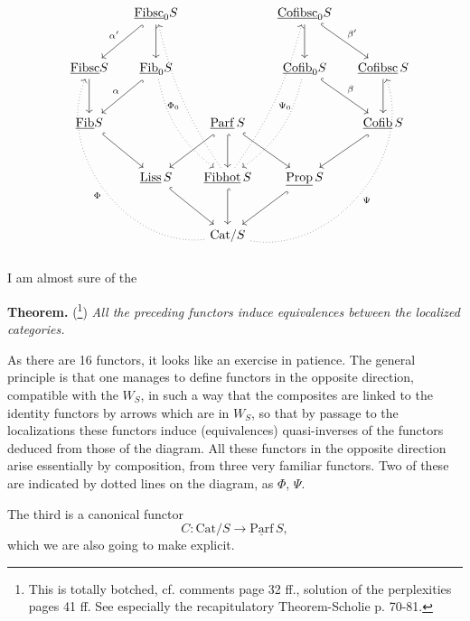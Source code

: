 \documentclass[11pt]{article}
\newcommand{\printedpage}[1]{\marginpar{\footnotesize p.~#1}}
\newcommand{\msp}[1]{\marginpar{\footnotesize [#1]}}
\newcommand{\ul}[1]{\underline{\mathrm{#1}}}
\begin{document}
\printedpage{6}
\msp{page 8}
\[
\begin{tikzcd}[column sep=small, row sep=large]
 & \ul{Fibsc}_0S \arrow[dl, hook, "\alpha'"'] \arrow[d] & & \ul{Cofibsc}_0S \arrow[d] \arrow[dr, hook, "\beta'"] & \\
\ul{Fibsc}S \arrow[d] & \ul{Fib}_0S \arrow[dl, hook, "\alpha"'] \arrow[ddr, dotted, bend right=20] & & \ul{Cofib}_0S \arrow[dr, hook, "\beta"] \arrow[ddl, dotted, bend left=20] & \ul{Cofibsc}\,S \arrow[d] \\
\ul{Fib}S \arrow[dr, hook] & & \ul{Parf}\,S \arrow[dl, hook] \arrow[d, hook] \arrow[dr, hook] & & \ul{Cofib}\,S \arrow[dl, hook] \\
 & \ul{Liss}\,S \arrow[dr, hook] & \ul{Fibhot}\,S \arrow[d, hook] \arrow[uuul, dotted, bend left=10, "\Phi_0"] \arrow[uuur, dotted, bend right=10, "\Psi_0"'] & \ul{Prop}\,S \arrow[dl, hook] & \\
 & & \mathrm{Cat}/S \arrow[uuull, dotted, bend left=60, "\Phi"] \arrow[uuurr, dotted, bend right=60, "\Psi"'] & &
\end{tikzcd}
\]



I am almost sure of the

\textbf{Theorem.} (\footnote[6]{This is totally botched, cf. comments page 32 ff., solution of the perplexities pages 41 ff. See especially the recapitulatory Theorem-Scholie p. 70-81.}) \textit{All the preceding functors induce equivalences between the localized categories.} %

As there are 16 functors, it looks like an exercise in patience. The general principle is that one manages to define functors in the opposite direction, compatible with the $W_S$, in such a way that the composites are linked to the identity functors by arrows which are in $W_S$, so that by passage to the localizations these functors induce (equivalences) quasi-inverses of the functors deduced from those of the diagram. All these functors in the opposite direction arise essentially by composition, from three very familiar functors. Two of these are indicated by dotted lines on the diagram, as $\Phi$, $\Psi$. %

\msp{page 9}
The third is a canonical functor
\[
C : \mathrm{Cat}/S \longrightarrow \ul{Parf}\,S,
\]
which we are also going to make explicit.
\end{document}
